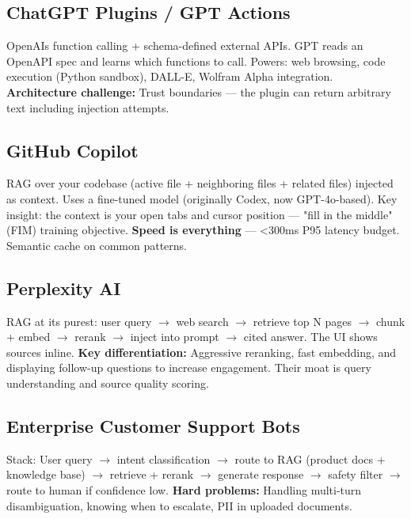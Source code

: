 \documentclass[11pt]{article}
\begin{document}
\subsection{ChatGPT Plugins / GPT Actions}\label{chatgpt-plugins--gpt-actions}

OpenAI\textquotesingle s function calling + schema-defined external APIs. GPT reads an OpenAPI spec and learns which functions to call. Powers: web browsing, code execution (Python sandbox), DALL-E, Wolfram Alpha integration. \textbf{Architecture challenge:} Trust boundaries --- the plugin can return arbitrary text including injection attempts.

\subsection{GitHub Copilot}\label{github-copilot}

RAG over your codebase (active file + neighboring files + related files) injected as context. Uses a fine-tuned model (originally Codex, now GPT-4o-based). Key insight: the context is your open tabs and cursor position --- "fill in the middle" (FIM) training objective. \textbf{Speed is everything} --- \textless300ms P95 latency budget. Semantic cache on common patterns.

\subsection{Perplexity AI}\label{perplexity-ai}

RAG at its purest: user query \(\rightarrow\) web search \(\rightarrow\) retrieve top N pages \(\rightarrow\) chunk + embed \(\rightarrow\) rerank \(\rightarrow\) inject into prompt \(\rightarrow\) cited answer. The UI shows sources inline. \textbf{Key differentiation:} Aggressive reranking, fast embedding, and displaying follow-up questions to increase engagement. Their moat is query understanding and source quality scoring.

\subsection{Enterprise Customer Support Bots}\label{enterprise-customer-support-bots}

Stack: User query \(\rightarrow\) intent classification \(\rightarrow\) route to RAG (product docs + knowledge base) \(\rightarrow\) retrieve + rerank \(\rightarrow\) generate response \(\rightarrow\) safety filter \(\rightarrow\) route to human if confidence low. \textbf{Hard problems:} Handling multi-turn disambiguation, knowing when to escalate, PII in uploaded documents.
\end{document}
